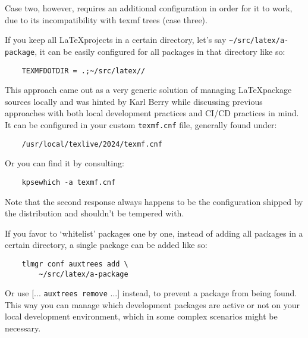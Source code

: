 \documentclass{xdpdoc}
\begin{document}
\begin{multicols}{2}
        Case two, however, requires an additional configuration in order for it to work, due to its incompatibility with texmf trees (case three).\\
        \label{fig:project dir}\bigskip

        If you keep all \LaTeX projects in a certain directory, let's say \texttt{\textasciitilde/src/latex/a-package}, it can be easily configured for all packages in that directory like so:
        \begin{lstlisting}
    TEXMFDOTDIR = .;~/src/latex//
        \end{lstlisting}
        This approach came out as a very generic solution of managing \LaTeX package sources locally and was hinted by Karl Berry while discussing previous approaches with both local development practices and CI/CD practices in mind.
        It can be configured in your custom \texttt{texmf.cnf} file, generally found under:
        \begin{lstlisting}
    /usr/local/texlive/2024/texmf.cnf
        \end{lstlisting}
        Or you can find it by consulting:
        \begin{lstlisting}
    kpsewhich -a texmf.cnf
        \end{lstlisting}
        Note that the second response always happens to be the configuration shipped by the \TeXLive distribution and shouldn't be tempered with.

        If you favor to `whitelist' packages one by one, instead of adding all packages in a certain directory, a single package can be added like so:
        \begin{lstlisting}
    tlmgr conf auxtrees add \
        ~/src/latex/a-package
        \end{lstlisting}
        Or use [... \texttt{auxtrees remove} ...] instead, to prevent a package from being found.
        This way you can manage which development packages are active or not on your local development environment, which in some complex scenarios might be necessary.


\end{multicols}
\end{document}
